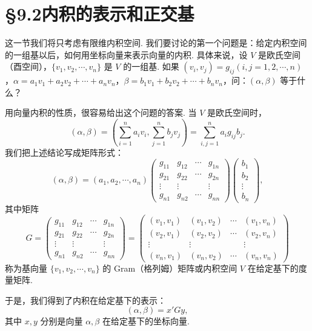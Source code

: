 \documentclass[UTF8, 12pt, fontset=fandol, oneside]{ctexart}
\begin{document}
\section*{§9.2\quad 内积的表示和正交基}

这一节我们将只考虑有限维内积空间. 我们要讨论的第一个问题是：给定内积空间的一组基以后，如何用坐标向量来表示向量的内积. 具体来说，设 $V$ 是欧氏空间（酉空间），$\{v_1,v_2,\cdots,v_n\}$ 是 $V$ 的一组基. 如果 $(v_i,v_j)=g_{ij}(i,j=1,2,\cdots,n)$，$\alpha=a_1v_1+a_2v_2+\cdots+a_nv_n$，$\beta=b_1v_1+b_2v_2+\cdots+b_nv_n$，问：$(\alpha,\beta)$ 等于什么？

用向量内积的性质，很容易给出这个问题的答案. 当 $V$ 是欧氏空间时，
\[
  (\alpha,\beta)=\left(\sum_{i=1}^n a_iv_i,\sum_{j=1}^n b_jv_j\right)
  =\sum_{i,j=1}^n a_ig_{ij}b_j.
\]
我们把上述结论写成矩阵形式：
\[
  (\alpha,\beta)=
  (a_1,a_2,\cdots,a_n)
  \left(\begin{array}{cccc}
    g_{11} & g_{12} & \cdots & g_{1n}\\
    g_{21} & g_{22} & \cdots & g_{2n}\\
    \vdots & \vdots & & \vdots\\
    g_{n1} & g_{n2} & \cdots & g_{nn}
  \end{array}\right)
  \left(\begin{array}{c}
    b_1\\ b_2\\ \vdots\\ b_n
  \end{array}\right),
\]
其中矩阵
\[
  G=
  \left(\begin{array}{cccc}
    g_{11} & g_{12} & \cdots & g_{1n}\\
    g_{21} & g_{22} & \cdots & g_{2n}\\
    \vdots & \vdots & & \vdots\\
    g_{n1} & g_{n2} & \cdots & g_{nn}
  \end{array}\right)
  =
  \left(\begin{array}{cccc}
    (v_1,v_1) & (v_1,v_2) & \cdots & (v_1,v_n)\\
    (v_2,v_1) & (v_2,v_2) & \cdots & (v_2,v_n)\\
    \vdots & \vdots & & \vdots\\
    (v_n,v_1) & (v_n,v_2) & \cdots & (v_n,v_n)
  \end{array}\right)
\]
称为基向量 $\{v_1,v_2,\cdots,v_n\}$ 的 Gram（格列姆）矩阵或内积空间 $V$ 在给定基下的度量矩阵.

于是，我们得到了内积在给定基下的表示：
\begin{equation}
  (\alpha,\beta)=x'Gy,
  \tag{9.2.1}
\end{equation}
其中 $x,y$ 分别是向量 $\alpha,\beta$ 在给定基下的坐标向量.
\end{document}
